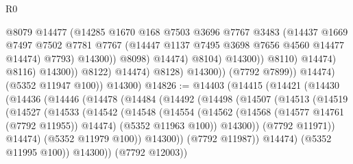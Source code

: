 \begin{lexlean}{R0}
\begin{coremodule}
                                            @8079
                                            @14477
                                            (@14285
                                              @1670
                                              @168
                                              @7503
                                              @3696
                                              @7767
                                              @3483
                                              (@14437
                                                @1669
                                                @7497
                                                @7502
                                                @7781
                                                @7767
                                                (@14447 @1137 @7495 @3698 @7656 @4560 @14477 @14474)
                                                @7793)
                                              @14300))
                                          @8098)
                                        @14474)
                                      @8104)
                                    @14300))
                                @8110)
                              @14474)
                            @8116)
                          @14300))
                      @8122)
                    @14474)
                  @8128)
                @14300))
            (@7792 @7899))
          @14474)
        (@5352 @11947 @100))
      @14300)
@14826 := @14403
    (@14415
      (@14421
        (@14430
          (@14436
            (@14446
              (@14478
                (@14484
                  (@14492
                    (@14498
                      (@14507
                        (@14513
                          (@14519
                            (@14527
                              (@14533
                                (@14542
                                  (@14548
                                    (@14554
                                      (@14562
                                        (@14568 (@14577 @14761 (@7792 @11955)) @14474)
                                        (@5352 @11963 @100))
                                      @14300))
                                  (@7792 @11971))
                                @14474)
                              (@5352 @11979 @100))
                            @14300))
                        (@7792 @11987))
                      @14474)
                    (@5352 @11995 @100))
                  @14300))
              (@7792 @12003))

\end{coremodule}
\end{lexlean}
